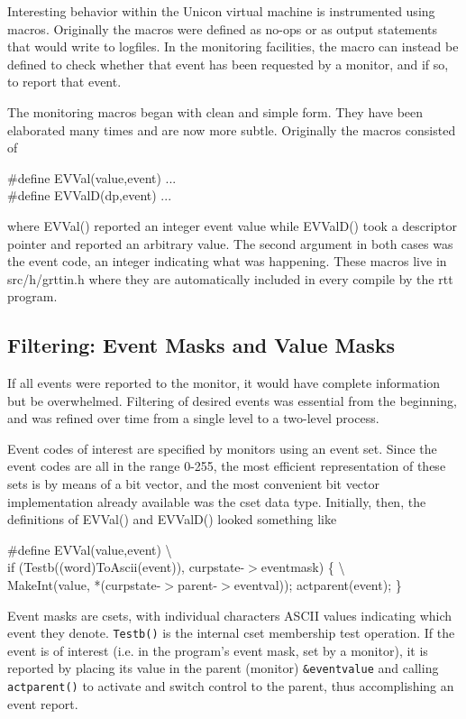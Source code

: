 Interesting behavior within the Unicon virtual machine is instrumented
using macros. Originally the macros were defined as no-ops or as
output statements that would write to logfiles. In the monitoring
facilities, the macro can instead be defined to check whether that
event has been requested by a monitor, and if so, to report that
event.

The monitoring macros began with clean and simple form. They have been
elaborated many times and are now more subtle. Originally the macros
consisted of

\begin{iconcode}
\#define EVVal(value,event) ... \\
\#define EVValD(dp,event) ...
\end{iconcode}

\noindent
where EVVal() reported an integer event value while EVValD() took a
descriptor pointer and reported an arbitrary value. The second
argument in both cases was the event code, an integer indicating what
was happening.  These macros live in src/h/grttin.h where they are
automatically included in every compile by the rtt program.

\subsection{Filtering: Event Masks and Value Masks}

If all events were reported to the monitor, it would have complete
information but be overwhelmed. Filtering of desired events was
essential from the beginning, and was refined over time from a single
level to a two-level process.

Event codes of interest are specified by monitors using an event
set. Since the event codes are all in the range 0-255, the most
efficient representation of these sets is by means of a bit vector,
and the most convenient bit vector implementation already available
was the cset data type.  Initially, then, the definitions of EVVal()
and EVValD() looked something like

\begin{iconcode}
\#define EVVal(value,event) {\textbackslash} \\
\>   if (Testb((word)ToAscii(event)), curpstate-$>$eventmask) \{ {\textbackslash} \\
\>\>      MakeInt(value, *(curpstate-$>$parent-$>$eventval)); actparent(event); \}
\end{iconcode}

Event masks are csets, with individual characters ASCII values
indicating which event they denote. \texttt{Testb()} is the internal
cset membership test operation.  If the event is of interest (i.e. in
the program's event mask, set by a monitor), it is reported by placing
its value in the parent (monitor) \texttt{\&eventvalue} and calling
\texttt{actparent()} to activate and switch control to the parent,
thus accomplishing an event report.

